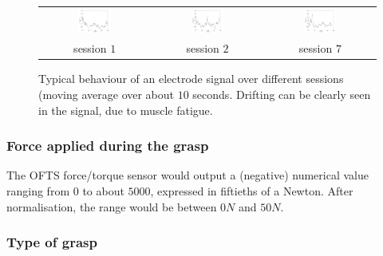 \begin{figure}[!ht] \centering
  \begin{tabular}{ccc}
    \includegraphics[width=0.32\textwidth]{figs/el8_movingAvg_s1} &
    \includegraphics[width=0.32\textwidth]{figs/el8_movingAvg_s2} &
    \includegraphics[width=0.32\textwidth]{figs/el8_movingAvg_s7} \\
    session $1$ & session $2$ & session $7$ \\
  \end{tabular}
  \caption{Typical behaviour of an electrode signal over different
  sessions (moving average over about $10$ seconds. Drifting can be
  clearly seen in the signal, due to muscle fatigue.}
  \label{fig:drift}
\end{figure}

\subsubsection{Force applied during the grasp}

The OFTS force/torque sensor would output a (negative) numerical value
ranging from $0$ to about $5000$, expressed in fiftieths of a
Newton. After normalisation, the range would be between $0N$ and
$50N$.

\subsubsection{Type of grasp}

